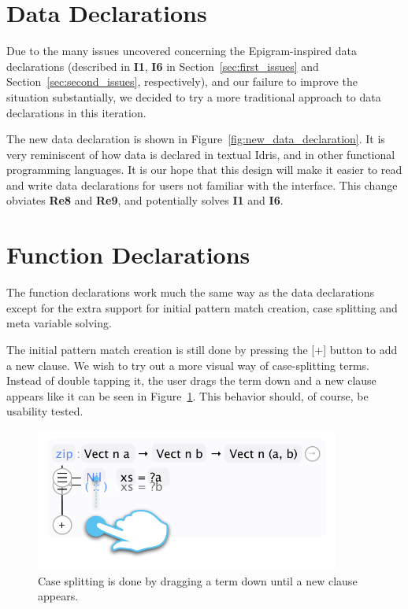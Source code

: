 \section{Data Declarations}
\label{subsec:new_design_data_dec}
Due to the many issues uncovered concerning the Epigram-inspired data declarations (described in \textbf{I1}, \textbf{I6} in Section~\ref{sec:first_issues} and Section~\ref{sec:second_issues}, respectively), and our failure to improve the situation substantially, we decided to try a more traditional approach to data declarations
in this iteration.

The new data declaration is shown in Figure~\ref{fig:new_data_declaration}.
It is very reminiscent of how data is declared in textual Idris, and in other functional programming languages.
It is our hope that this design will make it easier to read and write data declarations for users not familiar with the interface. This change obviates \textbf{Re8} and \textbf{Re9}, and potentially solves \textbf{I1} and \textbf{I6}.

\section{Function Declarations}
\label{subsec:new_design_function_dec}
The function declarations work much the same way as the data declarations
except for the extra support for initial pattern match creation, case splitting
and meta variable solving.

The initial pattern match creation is still done by pressing the [+] button to
add a new clause. We wish to try out a more visual way of case-splitting terms. Instead of double tapping it, the user drags the term
down and a new clause appears like it can be seen in Figure~\ref{fig:case_splitting}.
This behavior should, of course, be usability tested.

\begin{figure}
	\centering
		\includegraphics[width=100mm]{diagrams/design_case_splitting.pdf}
	\caption{Case splitting is done by dragging a term down until a new clause
	appears.}
\label{fig:case_splitting}
\end{figure}

